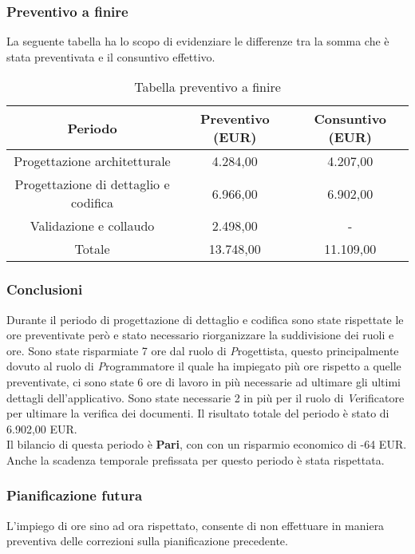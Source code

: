 \subsubsection{Preventivo a finire}
La seguente tabella ha lo scopo di evidenziare le differenze tra la somma che è stata preventivata e il consuntivo effettivo.
\begin{table}[h]
	\caption{Tabella preventivo a finire}  
	\begin{center}
		\begin{tabular}{ |c|c|c|  }
			\hline
			Periodo 								& Preventivo (EUR) & Consuntivo (EUR)\\
			\hline\hline
			Progettazione architetturale			& 4.284,00 				& 4.207,00\\
			Progettazione di dettaglio e codifica	& 6.966,00 			& 6.902,00\\
			Validazione e collaudo					& 2.498,00 			& -\\
			\hline\hline
			Totale									& 13.748,00 				& 11.109,00 \\
			\hline
		\end{tabular}
	\end{center}
\end{table}
\subsubsection{Conclusioni}
Durante il periodo di progettazione di dettaglio e codifica sono state rispettate le ore preventivate però e stato necessario riorganizzare la suddivisione dei ruoli e ore. Sono state risparmiate 7 ore dal ruolo di \textit Progettista, questo principalmente dovuto al ruolo di \textit Programmatore il quale ha impiegato più ore rispetto a quelle preventivate, ci sono state 6 ore di lavoro in più necessarie ad ultimare gli ultimi dettagli dell’applicativo. Sono state necessarie 2 in più per il ruolo di \textit Verificatore per ultimare la verifica dei documenti. Il risultato totale del periodo è stato di 6.902,00 EUR.
\\Il bilancio di questa periodo è \textbf{Pari}, con con un risparmio economico di -64 EUR. Anche la scadenza temporale prefissata per questo periodo è stata rispettata.

\subsubsection{Pianificazione futura}
L'impiego di ore sino ad ora rispettato, consente di non effettuare in maniera preventiva delle correzioni sulla pianificazione precedente. 